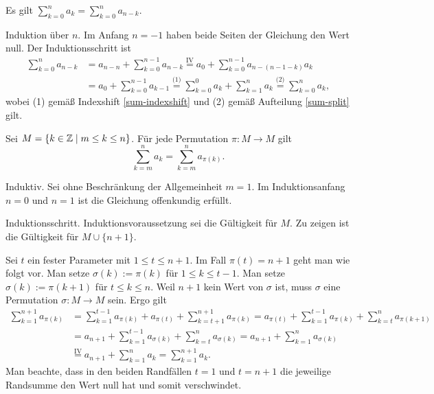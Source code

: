 \begin{Satz}\label{sum-rev}\newlinefirst
Es gilt $\sum_{k=0}^n a_k = \sum_{k=0}^n a_{n-k}$.
\end{Satz}
\begin{Beweis}
Induktion über $n$. Im Anfang $n=-1$ haben beide Seiten der Gleichung
den Wert null. Der Induktionsschritt ist
\begin{align*}
\sum_{k=0}^n a_{n-k} &= a_{n-n} + \sum_{k=0}^{n-1} a_{n-k}
\stackrel{\mathrm{IV}}= a_0+\sum_{k=0}^{n-1} a_{n-(n-1-k)}a_k\\
&= a_0+\sum_{k=0}^{n-1} a_{k-1}
\stackrel{\text{(1)}}= \sum_{k=0}^0 a_k+\sum_{k=1}^n a_k
\stackrel{\text{(2)}}= \sum_{k=0}^n a_k,
\end{align*}
wobei (1) gemäß Indexshift \ref{sum-indexshift} und
(2) gemäß Aufteilung \ref{sum-split} gilt.\,\qedsymbol
\end{Beweis}

\newpage
\begin{Satz}%
\label{sum-perm-index}\newlinefirst
Sei $M=\{k\in\mathbb Z\mid m\le k\le n\}$. Für jede Permutation $\pi\colon M\to M$ gilt
\[\sum_{k=m}^n a_k = \sum_{k=m}^n a_{\pi(k)}.\]
\end{Satz}
\begin{Beweis} Induktiv. Sei ohne Beschränkung der Allgemeinheit $m=1$.
Im Induktionsanfang $n=0$ und $n=1$ ist die Gleichung offenkundig erfüllt.

Induktionsschritt. Induktionsvoraussetzung sei die Gültigkeit für $M$.
Zu zeigen ist die Gültigkeit für $M\cup\{n+1\}$.

Sei $t$ ein fester Parameter mit $1\le t\le n+1$.
Im Fall $\pi(t) = n+1$ geht man wie folgt vor.
Man setze $\sigma(k):=\pi(k)$ für $1\le k\le t-1$. Man setze
$\sigma(k):=\pi(k+1)$ für $t\le k\le n$. Weil $n+1$ kein Wert von
$\sigma$ ist, muss $\sigma$ eine Permutation $\sigma\colon M\to M$ sein.
Ergo gilt
\begin{align*}
\sum_{k=1}^{n+1} a_{\pi(k)} &= \sum_{k=1}^{t-1} a_{\pi(k)}
+ a_{\pi(t)} + \sum_{k=t+1}^{n+1} a_{\pi(k)}
= a_{\pi(t)} + \sum_{k=1}^{t-1} a_{\pi(k)}
+ \sum_{k=t}^n a_{\pi(k+1)}\\
&= a_{n+1} + \sum_{k=1}^{t-1} a_{\sigma(k)}
+ \sum_{k=t}^n a_{\sigma(k)}
= a_{n+1} + \sum_{k=1}^n a_{\sigma(k)}\\
&\stackrel{\mathrm{IV}}= a_{n+1} + \sum_{k=1}^n a_k
= \sum_{k=1}^{n+1} a_k.
\end{align*}
Man beachte, dass in den beiden Randfällen $t=1$ und $t=n+1$ die
jeweilige Randsumme den Wert null hat und somit verschwindet.\,\qedsymbol
\end{Beweis}

